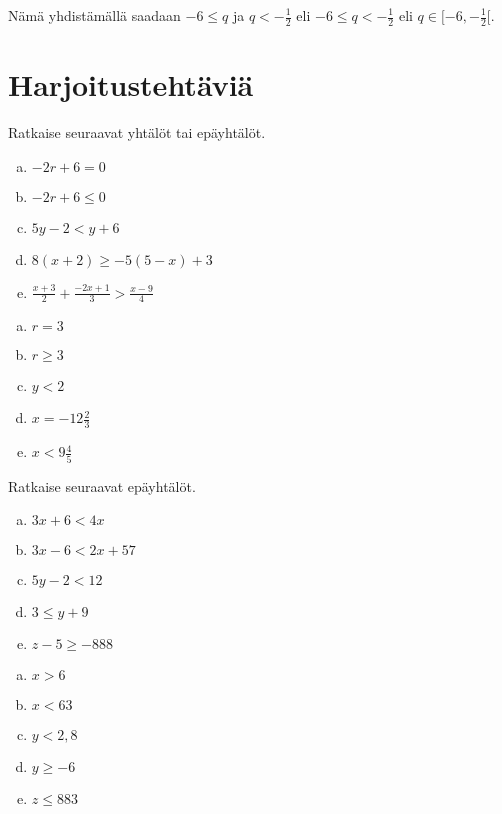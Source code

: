 \begin{lukusuora}{-6}{10}{6}
\lukusuorauusi
\end{lukusuora}


Nämä yhdistämällä saadaan $-6\leq q$ ja $q< -\frac12$ eli $-6\leq q < -\frac12$ eli $q\in [-6, -\frac12[$.

\section{Harjoitustehtäviä}

\begin{tehtava}
    Ratkaise seuraavat yhtälöt tai epäyhtälöt.
    \begin{enumerate}[a)]
        \item $-2r+6=0$
        \item $-2r+6\leq 0$
        \item $5y-2<y+6$
        \item $8(x+2)\geq -5(5-x)+3$
        \item $\frac{x+3}{2}+\frac{-2x+1}{3}>\frac{x-9}{4}$
    \end{enumerate}
    \begin{vastaus}
        \begin{enumerate}[a)]
            \item $r=3$
            \item $r\geq 3$
            \item $y<2$
            \item $x=-12\frac{2}{3}$
            \item $x<9\frac{4}{5}$
        \end{enumerate}
    \end{vastaus}
\end{tehtava}

\begin{tehtava}
    Ratkaise seuraavat epäyhtälöt.
    \begin{enumerate}[a)]
        \item $3x+6<4x$
        \item $3x-6<2x+57$
        \item $5y-2<12$
        \item $3\leq y+9$
        \item $z-5\geq-888$
    \end{enumerate}
    \begin{vastaus}
        \begin{enumerate}[a)]
            \item $x>6$
            \item $x<63$
            \item $y<2,8$
            \item $y\geq -6$
            \item $z\leq 883$
        \end{enumerate}
    \end{vastaus}
\end{tehtava}

